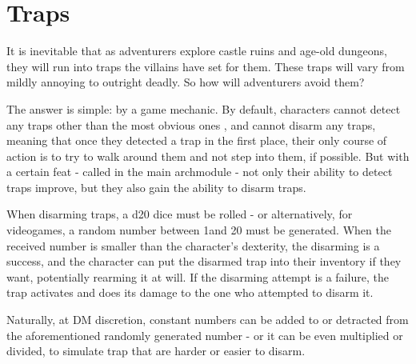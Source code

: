 \section{Traps}
It is inevitable that as adventurers explore castle ruins and age-old dungeons, they will run into traps the villains have set for them. These traps will vary from mildly annoying to outright deadly. So how will adventurers avoid them?

The answer is simple: by a game mechanic. By default, characters cannot detect any traps other than the most obvious ones , and cannot disarm any traps, meaning that once they detected a trap in the first place, their only course of action is to try to walk around them and not step into them, if possible. But with a certain feat - called  in the main archmodule - not only their ability to detect traps improve, but they also gain the ability to disarm traps.

When disarming traps, a d20 dice  must be rolled - or alternatively, for videogames, a random number between 1and 20 must be generated. When the received number is smaller than the character's dexterity, the disarming is a success, and the character can put the disarmed trap into their inventory if they want, potentially rearming it at will. If the disarming attempt is a failure, the trap activates and does its damage to the one who attempted to disarm it.

Naturally, at DM discretion, constant numbers can be added to or detracted from the aforementioned randomly generated number - or it can be even multiplied or divided, to simulate trap that are harder or easier to disarm.

